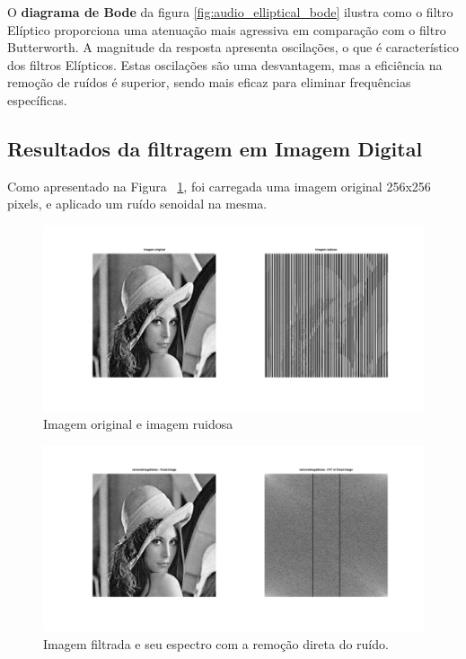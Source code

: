 O \textbf{diagrama de Bode} da figura \ref{fig:audio_elliptical_bode} ilustra como o filtro Elíptico proporciona uma atenuação mais agressiva em comparação com o filtro Butterworth. A magnitude da resposta apresenta oscilações, o que é característico dos filtros Elípticos. Estas oscilações são uma desvantagem, mas a eficiência na remoção de ruídos é superior, sendo mais eficaz para eliminar frequências específicas.

\subsection{Resultados da filtragem em Imagem Digital}
Como apresentado na Figura ~\ref{fig:image_original_plus_noise}, foi carregada uma imagem original 256x256 pixels, e aplicado um ruído senoidal na mesma.

\begin{figure}[H]
    \centering
    \includegraphics[width=1\linewidth]{03_results/assets/image_original_plus_noise.png}
    \caption{Imagem original e imagem ruidosa}
    \label{fig:image_original_plus_noise}
\end{figure}


\begin{figure}[H]
    \centering
    \includegraphics[width=1\linewidth]{03_results/assets/image_direct_remove_noise.png}
    \caption{Imagem filtrada e seu espectro com a remoção direta do ruído.}
    \label{fig:image_direct_remove_noise}
\end{figure}

